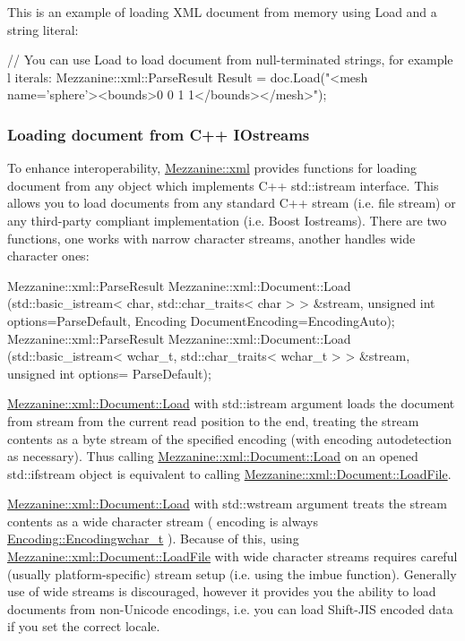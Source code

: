  This is an example of loading XML document from memory using Load and a string literal: 
\begin{DoxyCode}
 // You can use Load to load document from null-terminated strings, for example l
      iterals:
 Mezzanine::xml::ParseResult Result = doc.Load("<mesh name='sphere'><bounds>0 0 1
       1</bounds></mesh>");
\end{DoxyCode}
 \hypertarget{XMLManual_XMLLoadingStreams}{}\subsubsection{Loading document from C++ IOstreams}\label{XMLManual_XMLLoadingStreams}
To enhance interoperability, \hyperlink{namespaceMezzanine_1_1xml}{Mezzanine::xml} provides functions for loading document from any object which implements C++ std::istream interface. This allows you to load documents from any standard C++ stream (i.e. file stream) or any third-\/party compliant implementation (i.e. Boost Iostreams). There are two functions, one works with narrow character streams, another handles wide character ones: 
\begin{DoxyCode}
 Mezzanine::xml::ParseResult Mezzanine::xml::Document::Load (std::basic_istream< 
      char, std::char_traits< char > > &stream, unsigned int options=ParseDefault, 
      Encoding DocumentEncoding=EncodingAuto);
 Mezzanine::xml::ParseResult Mezzanine::xml::Document::Load (std::basic_istream< 
      wchar_t, std::char_traits< wchar_t > > &stream, unsigned int options=
      ParseDefault);
\end{DoxyCode}
 \hyperlink{classMezzanine_1_1xml_1_1Document_a6f10e6e475965a1dba3d5903fefb34dd}{Mezzanine::xml::Document::Load} with std::istream argument loads the document from stream from the current read position to the end, treating the stream contents as a byte stream of the specified encoding (with encoding autodetection as necessary). Thus calling \hyperlink{classMezzanine_1_1xml_1_1Document_a6f10e6e475965a1dba3d5903fefb34dd}{Mezzanine::xml::Document::Load} on an opened std::ifstream object is equivalent to calling \hyperlink{classMezzanine_1_1xml_1_1Document_acfbe29500930edf6575b9f4eb12a7936}{Mezzanine::xml::Document::LoadFile}. \par
 \par
 \hyperlink{classMezzanine_1_1xml_1_1Document_a6f10e6e475965a1dba3d5903fefb34dd}{Mezzanine::xml::Document::Load} with std::wstream argument treats the stream contents as a wide character stream ( encoding is always \hyperlink{namespaceMezzanine_1_1xml_ab1e7e96991b9c08ac13e797a15253804}{Encoding::Encodingwchar\_\-t} ). Because of this, using \hyperlink{classMezzanine_1_1xml_1_1Document_acfbe29500930edf6575b9f4eb12a7936}{Mezzanine::xml::Document::LoadFile} with wide character streams requires careful (usually platform-\/specific) stream setup (i.e. using the imbue function). Generally use of wide streams is discouraged, however it provides you the ability to load documents from non-\/Unicode encodings, i.e. you can load Shift-\/JIS encoded data if you set the correct locale. \par
